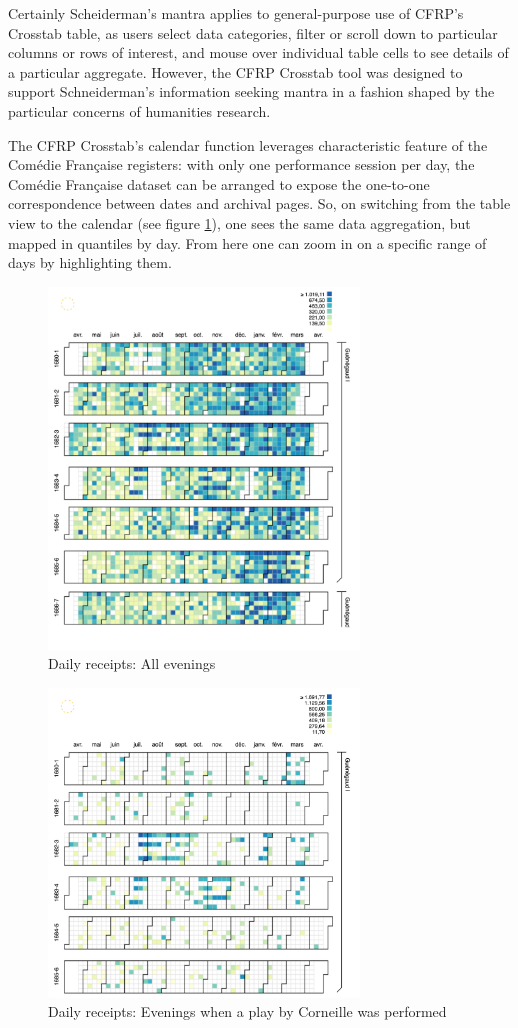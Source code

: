 \documentclass[	DIV=calc,%
							paper=a4,%
							fontsize=11pt,%
							twocolumn]{scrartcl}	 					%
\begin{document}
Certainly Scheiderman’s mantra applies to general-purpose use of CFRP’s Crosstab table, as users select data categories, filter or scroll down to particular columns or rows of interest, and mouse over individual table cells to see details of a particular aggregate.  However, the CFRP Crosstab tool was designed to support Schneiderman’s information seeking mantra in a fashion shaped by the particular concerns of humanities research.

The CFRP Crosstab’s calendar function leverages characteristic feature of the Comédie Française registers: with only one performance session per day, the Comédie Française dataset can be arranged to expose the one-to-one correspondence between dates and archival pages.  So, on switching from the table view to the calendar (see figure \ref{fig:calendar-receipts}), one sees the same data aggregation, but mapped in quantiles by day.  From here one can zoom in on a specific range of days by highlighting them.

\begin{figure}
  \centering
	\includegraphics[width=3.25in]{steps/calendar-receipts.png}
	\caption{Daily receipts: All evenings}
	\label{fig:calendar-receipts}
\end{figure}

\begin{figure}
  \centering
	\includegraphics[width=3.25in]{steps/corneille-1680s-receipts.png}
	\caption{Daily receipts: Evenings when a play by Corneille was performed}
	\label{fig:corneille-1680s-receipts}
\end{figure}
\end{document}
